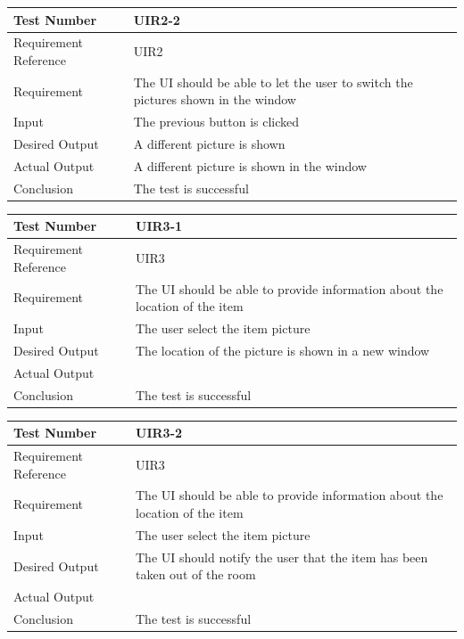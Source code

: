 \documentclass[12pt, titlepage]{article}
\begin{document}
\begin{table}[H]
\begin{center}
\begin{tabular}{|l | m{9cm}|}
\hline
  Test Number & UIR2-2\\
  \hline
  Requirement Reference & UIR2\\
  \hline
  Requirement & The UI should be able to let the user to switch the pictures shown in the window \\
  \hline
  Input & The previous button is clicked\\
  \hline
  Desired Output & A different picture is shown\\
  \hline
  Actual Output & A different picture is shown in the window \\
  \hline
  Conclusion & The test is successful\\
  \hline
\end{tabular}
\end{center}           
\end{table}

\begin{table}[H]
\begin{center}
\begin{tabular}{|l | m{9cm}|}
\hline
  Test Number & UIR3-1\\
  \hline
  Requirement Reference & UIR3\\
  \hline
  Requirement & The UI should be able to provide information about the location of the item \\
  \hline
  Input & The user select the item picture\\
  \hline
  Desired Output & The location of the picture is shown in a new window\\
  \hline
  Actual Output & \\
  \hline
  Conclusion & The test is successful\\
  \hline
\end{tabular}
\end{center}           
\end{table}

\begin{table}[H]
\begin{center}
\begin{tabular}{|l | m{9cm}|}
\hline
  Test Number & UIR3-2\\
  \hline
  Requirement Reference & UIR3\\
  \hline
  Requirement & The UI should be able to provide information about the location of the item \\
  \hline
  Input & The user select the item picture\\
  \hline
  Desired Output & The UI should notify the user that the item has been taken out of the room\\
  \hline
  Actual Output & \\
  \hline
  Conclusion & The test is successful\\
  \hline
\end{tabular}
\end{center}           
\end{table}
\end{document}
